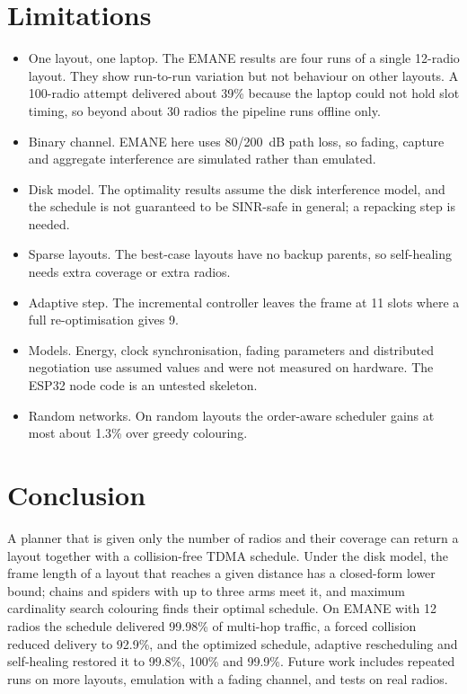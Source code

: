 \documentclass[conference]{IEEEtran}
\begin{document}
\section{Limitations}\label{sec:limits}
\begin{itemize}
\item One layout, one laptop. The EMANE results are four runs of a single 12-radio layout. They show run-to-run variation but not behaviour on other layouts. A 100-radio attempt delivered about 39\% because the laptop could not hold slot timing, so beyond about 30 radios the pipeline runs offline only.
\item Binary channel. EMANE here uses 80/200~dB path loss, so fading, capture and aggregate interference are simulated rather than emulated.
\item Disk model. The optimality results assume the disk interference model, and the schedule is not guaranteed to be SINR-safe in general; a repacking step is needed.
\item Sparse layouts. The best-case layouts have no backup parents, so self-healing needs extra coverage or extra radios.
\item Adaptive step. The incremental controller leaves the frame at 11 slots where a full re-optimisation gives 9.
\item Models. Energy, clock synchronisation, fading parameters and distributed negotiation use assumed values and were not measured on hardware. The ESP32 node code is an untested skeleton.
\item Random networks. On random layouts the order-aware scheduler gains at most about 1.3\% over greedy colouring.
\end{itemize}
\section{Conclusion}\label{sec:concl}
A planner that is given only the number of radios and their coverage can return a layout together with a collision-free TDMA schedule. Under the disk model, the frame length of a layout that reaches a given distance has a closed-form lower bound; chains and spiders with up to three arms meet it, and maximum cardinality search colouring finds their optimal schedule. On EMANE with 12 radios the schedule delivered 99.98\% of multi-hop traffic, a forced collision reduced delivery to 92.9\%, and the optimized schedule, adaptive rescheduling and self-healing restored it to 99.8\%, 100\% and 99.9\%. Future work includes repeated runs on more layouts, emulation with a fading channel, and tests on real radios.
\end{document}
